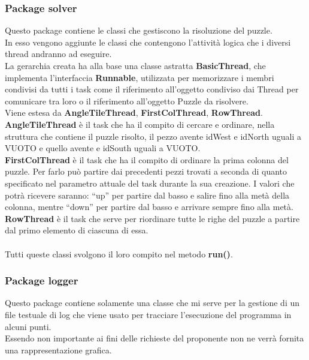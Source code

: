 		\subsubsection{Package solver} %
		\label{ssub:package_solver_2}
		Questo package contiene le classi che gestiscono la risoluzione del puzzle. \\
		In esso vengono aggiunte le classi che contengono l'attività logica che i diversi thread andranno ad eseguire. \\
		La gerarchia creata ha alla base una classe astratta \textbf{BasicThread}, che implementa l'interfaccia \textbf{Runnable}, utilizzata per memorizzare i membri condivisi da tutti i task come il riferimento all'oggetto condiviso dai Thread per comunicare tra loro o il riferimento all'oggetto Puzzle da risolvere. \\
		Viene estesa da \textbf{AngleTileThread}, \textbf{FirstColThread}, \textbf{RowThread}. \\
		\textbf{AngleTileThread} è il task che ha il compito di cercare e ordinare, nella struttura che contiene il puzzle risolto, il pezzo avente idWest e idNorth uguali a VUOTO e quello avente e idSouth uguali a VUOTO. \\
		\textbf{FirstColThread} è il task che ha il compito di ordinare la prima colonna del puzzle. Per farlo può partire dai precedenti pezzi trovati a seconda di quanto specificato nel parametro attuale del task durante la sua creazione. I valori che potrà ricevere saranno: ``up'' per partire dal basso e salire fino alla metà della colonna, mentre ``down'' per partire dal basso e arrivare sempre fino alla metà. \\
		\textbf{RowThread} è il task che serve per riordinare tutte le righe del puzzle a partire dal primo elemento di ciascuna di essa. \\
		\\
		Tutti queste classi svolgono il loro compito nel metodo \textbf{run()}.
		
		\subsubsection{Package logger} %
		\label{ssub:package_logger}
		Questo package contiene solamente una classe che mi serve per la gestione di un file testuale di log che viene usato per tracciare l'esecuzione del programma in alcuni punti. \\
		Essendo non importante ai fini delle richieste del proponente non ne verrà fornita una rappresentazione grafica.
		
